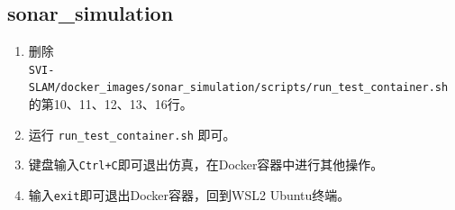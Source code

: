 \documentclass[UTF8,zhmap=true,fontset=none,zihao=-4,heading=false,scheme=chinese]{ctexart}
\begin{document}
\subsection{sonar\_simulation}
\begin{enumerate}
    \item 删除\\\verb|SVI-SLAM/docker_images/sonar_simulation/scripts/run_test_container.sh|\\的第10、11、12、13、16行。
    \item 运行 \verb|run_test_container.sh| 即可。
    \item 键盘输入\verb|Ctrl+C|即可退出仿真，在Docker容器中进行其他操作。
    \item 输入\verb|exit|即可退出Docker容器，回到WSL2 Ubuntu终端。
\end{enumerate}
\end{document}

